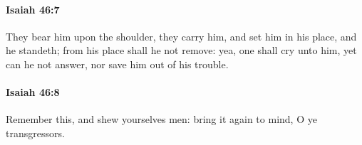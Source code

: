 		\paragraph{Isaiah 46:7} %
			\label{ISAIAH-46-7}

			They bear him upon the shoulder, they carry him, and set him in his place, and he standeth; from his place shall he not remove: yea, one shall cry unto him, yet can he not answer, nor save him out of his trouble.


		\paragraph{Isaiah 46:8} %
			\label{ISAIAH-46-8}

			Remember this, and shew yourselves men: bring it again to mind, O ye transgressors.


